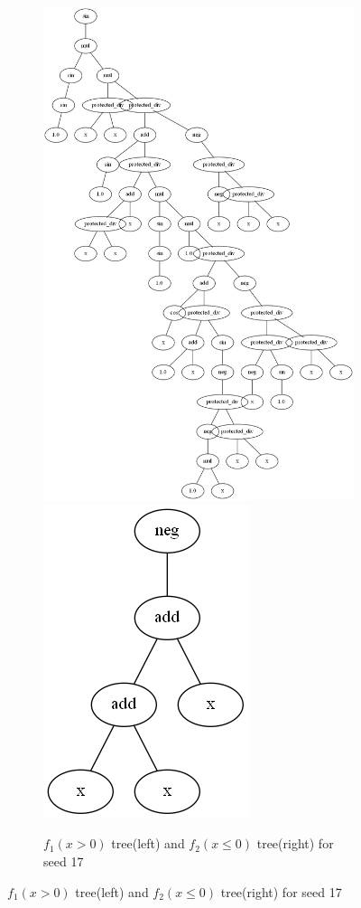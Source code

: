 \documentclass{article}
\begin{document}
\begin{figure}[h!]
	\centering
	\begin{subfigure}[b]{\linewidth}
		\includegraphics[width=0.5\linewidth]{ccgp_best_tree_17_1.png}
		\includegraphics[width=0.5\linewidth]{ccgp_best_tree_17_2.png}
		\caption{$f_1(x > 0)$ tree(left) and $f_2(x \le 0)$ tree(right) for seed 17}
	\end{subfigure}
\end{figure}
\end{document}
